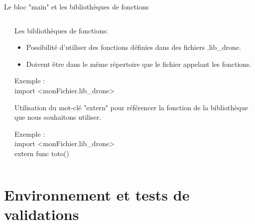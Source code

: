 \documentclass{bredelebeamer}
\begin{document}
\begin{frame}{Le bloc "main" et les bibliothèques de fonctions}
\begin{columns}
\begin{column}{0.5\textwidth}
\begin{tabbing}
\end{tabbing}	
\end{column}
\begin{column}{0.5\textwidth}
Les bibliothèques de fonctions:\\
\begin{itemize}
\item Possibilité d'utiliser des fonctions définies dans des fichiers .lib\_drone.
\item Doivent être dans le même répertoire que le fichier appelant les fonctions.
\end{itemize}\pause
\begin{tabbing}
Exemple :\=\\
            \>\color{Framarouge}import <\color{black}monFichier.lib\_drone\color{Framarouge}>\pause
\end{tabbing}		
\vspace{10px}
Utilisation du mot-clé "\color{Framarouge}extern\color{black}" pour référencer la fonction de la bibliothèque que nous souhaitons utiliser.
\begin{tabbing}
Exemple :\=\\
            \>\color{Framarouge}import <\color{black}monFichier.lib\_drone\color{Framarouge}>\\
	    \>\color{Framarouge}extern func \color{black} toto()
\end{tabbing}
\vspace{30px}

\end{column}
\end{columns}

\end{frame}


\section{Environnement et tests de validations}
\end{document}
